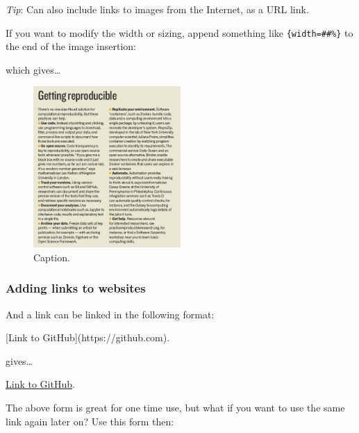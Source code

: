 \documentclass[]{Nemilov}
\newenvironment{Shaded}{\begin{snugshade}}{\end{snugshade}}
\newcommand{\AlertTok}[1]{\textcolor[rgb]{0.94,0.16,0.16}{#1}}
\newcommand{\NormalTok}[1]{#1}
\newcommand{\OtherTok}[1]{\textcolor[rgb]{0.56,0.35,0.01}{#1}}
\begin{document}
\emph{Tip}: Can also include links to images from the Internet, as a URL link.

If you want to modify the width or sizing, append something like \texttt{\{width=\#\#\%\}} to
the end of the image insertion:

\begin{Shaded}
\end{Shaded}

which gives\ldots{}

\begin{figure}
\centering
\includegraphics[width=0.5\textwidth,height=\textheight]{figures/r-reproducibility/code-sharing-steps.png}
\caption{Caption.}
\end{figure}

\hypertarget{adding-links-to-websites}{%
\subsubsection{Adding links to websites}\label{adding-links-to-websites}}

And a link can be linked in the following format:

\begin{Shaded}
\begin{Highlighting}[]
\OtherTok{[Link to GitHub](https://github.com)}\NormalTok{.}
\end{Highlighting}
\end{Shaded}

gives\ldots{}

\href{https://github.com}{Link to GitHub}.

The above form is great for one time use, but what if you want to use the same link
again later on? Use this form then:
\end{document}

